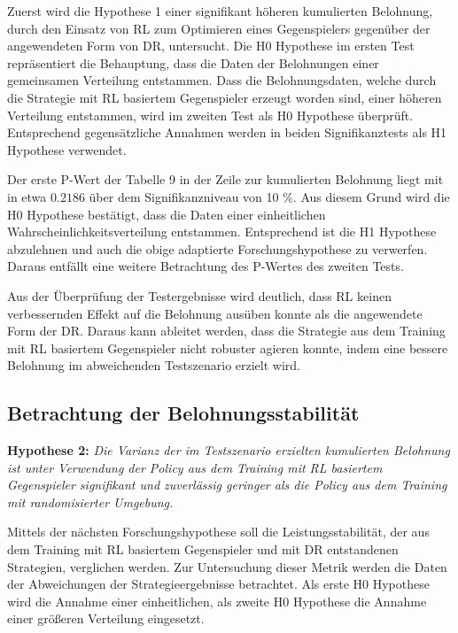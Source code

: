 Zuerst wird die Hypothese 1 einer signifikant höheren kumulierten Belohnung, durch den Einsatz von RL zum Optimieren eines Gegenspielers gegenüber der angewendeten Form von DR, untersucht.
Die H0 Hypothese im ersten Test repräsentiert die Behauptung, dass die Daten der Belohnungen einer gemeinsamen Verteilung entstammen. 
Dass die Belohnungsdaten, welche durch die Strategie mit RL basiertem Gegenspieler erzeugt worden sind, einer höheren Verteilung entstammen, wird im zweiten Test als H0 Hypothese überprüft.
Entsprechend gegensätzliche Annahmen werden in beiden Signifikanztests als H1 Hypothese verwendet.

Der erste P-Wert der Tabelle 9 in der Zeile zur kumulierten Belohnung liegt mit in etwa $0.2186$ über dem Signifikanzniveau von 10 \%.
Aus diesem Grund wird die H0 Hypothese bestätigt, dass die Daten einer einheitlichen Wahrscheinlichkeitsverteilung entstammen.
Entsprechend ist die H1 Hypothese abzulehnen und auch die obige adaptierte Forschungshypothese zu verwerfen.
Daraus entfällt eine weitere Betrachtung des P-Wertes des zweiten Tests.

Aus der Überprüfung der Testergebnisse wird deutlich, dass RL keinen verbessernden Effekt auf die Belohnung ausüben konnte als die angewendete Form der DR.
Daraus kann ableitet werden, dass die Strategie aus dem Training mit RL basiertem Gegenspieler nicht robuster agieren konnte, indem eine bessere Belohnung im abweichenden Testszenario erzielt wird.

\subsection{Betrachtung der Belohnungsstabilität}

\textbf{Hypothese 2:}
\textit{Die Varianz der im Testszenario erzielten kumulierten Belohnung ist unter Verwendung der Policy aus dem Training mit RL basiertem Gegenspieler signifikant und zuverlässig geringer als die Policy aus dem Training mit randomisierter Umgebung.}

Mittels der nächsten Forschungshypothese soll die Leistungsstabilität, der aus dem Training mit RL basiertem Gegenspieler und mit DR entstandenen Strategien, verglichen werden.
Zur Untersuchung dieser Metrik werden die Daten der Abweichungen der Strategieergebnisse betrachtet.
Als erste H0 Hypothese wird die Annahme einer einheitlichen, als zweite H0 Hypothese die Annahme einer größeren Verteilung eingesetzt. %

